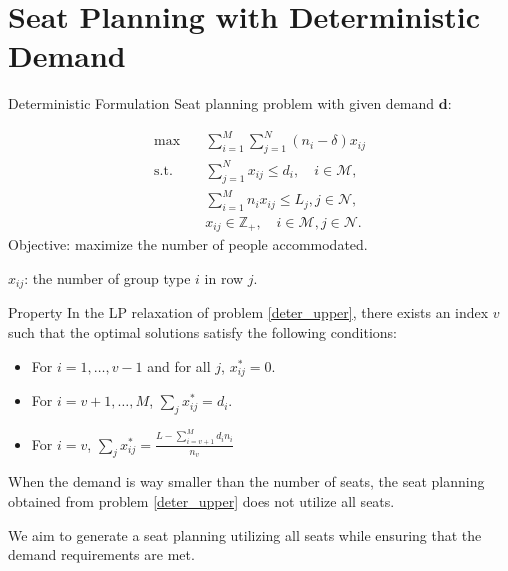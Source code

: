 
\section{Seat Planning with Deterministic Demand}
    \frame{\sectionpage}

  \begin{frame}{Deterministic Formulation}  %
    Seat planning problem with given demand $\bm{d}$:

    \begin{equation}\label{deter_upper}
      \begin{aligned}
      \max \quad & \sum_{i=1}^{M}  \sum_{j= 1}^{N} (n_i- \delta) x_{ij} \\
      \text {s.t.} \quad & \sum_{j= 1}^{N} x_{ij} \leq d_{i}, \quad i \in \mathcal{M}, \\
      & \sum_{i=1}^{M} n_{i} x_{ij} \leq L_j, j \in \mathcal{N}, \\
      & x_{ij} \in \mathbb{Z}_{+}, \quad i \in \mathcal{M}, j \in \mathcal{N}.
      \end{aligned}
    \end{equation}
    Objective: maximize the number of people accommodated.

    $x_{ij}$: the number of group type $i$ in row $j$.
  \end{frame}

  \begin{frame}{Property}
    In the LP relaxation of problem \eqref{deter_upper}, there exists an index $v$ such that the optimal solutions satisfy the following conditions:

    \begin{itemize}
      \item For $i = 1,\ldots, v-1$ and for all $j$, $x_{ij}^{*} = 0$. 
      \item For $i = v+1,\ldots, M$, $\sum_{j} x_{ij}^{*} = d_{i}$. 

      \item For $i = v$, $\sum_{j} x_{ij}^{*} = \frac{L - \sum_{i = v+1}^{M} {d_i n_i}}{n_v}$ 
    \end{itemize}

    \vspace{0.5cm}
    When the demand is way smaller than the number of seats, the seat planning obtained from problem \eqref{deter_upper} does not utilize all seats. 
    \vspace{0.5cm}

    We aim to generate a seat planning utilizing all seats while ensuring that the demand requirements are met.
  \end{frame}

